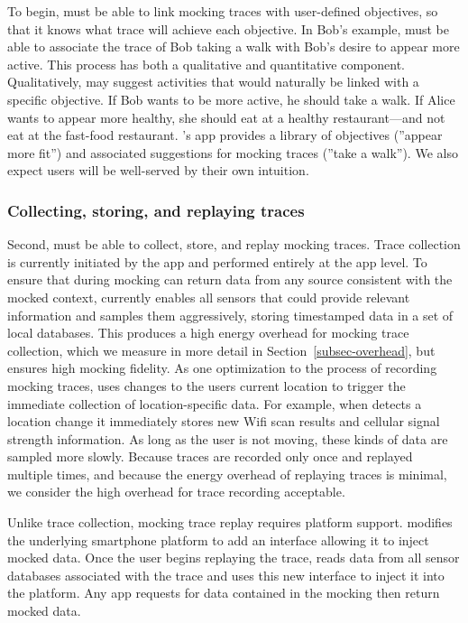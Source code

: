 To begin, \PocketMocker{} must be able to link mocking traces with
user-defined objectives, so that it knows what trace will achieve each
objective. In Bob's example, \PocketMocker{} must be able to associate the
trace of Bob taking a walk with Bob's desire to appear more active. This
process has both a qualitative and quantitative component. Qualitatively,
\PocketMocker{} may suggest activities that would naturally be linked with a
specific objective. If Bob wants to be more active, he should take a walk. If
Alice wants to appear more healthy, she should eat at a healthy
restaurant---and not eat at the fast-food restaurant. \PocketMocker{}'s app
provides a library of objectives (''appear more fit'') and associated
suggestions for mocking traces (''take a walk''). We also expect users will
be well-served by their own intuition.

\subsubsection{Collecting, storing, and replaying traces}

Second, \PocketMocker{} must be able to collect, store, and replay mocking
traces. Trace collection is currently initiated by the \PocketMocker{} app
and performed entirely at the app level. To ensure that during mocking
\PocketMocker{} can return data from any source consistent with the mocked
context, \PocketMocker{} currently enables all sensors that could provide
relevant information and samples them aggressively, storing timestamped data
in a set of local databases. This produces a high energy overhead for mocking
trace collection, which we measure in more detail in
Section~\ref{subsec-overhead}, but ensures high mocking fidelity. As one
optimization to the process of recording mocking traces, \PocketMocker{} uses
changes to the users current location to trigger the immediate collection of
location-specific data. For example, when \PocketMocker{} detects a location
change it immediately stores new Wifi scan results and cellular signal
strength information. As long as the user is not moving, these kinds of data
are sampled more slowly. Because traces are recorded only once and replayed
multiple times, and because the energy overhead of replaying traces is
minimal, we consider the high overhead for trace recording acceptable.

Unlike trace collection, mocking trace replay requires platform support.
\PocketMocker{} modifies the underlying smartphone platform to add an
interface allowing it to inject mocked data. Once the user begins replaying
the trace, \PocketMocker{} reads data from all sensor databases associated
with the trace and uses this new interface to inject it into the platform.
Any app requests for data contained in the mocking then return mocked data.

